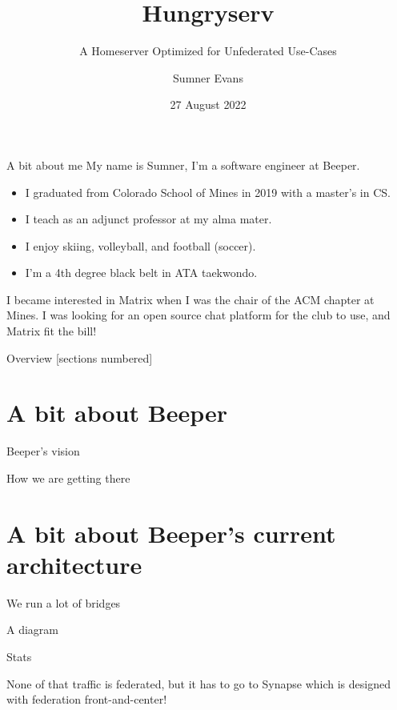 \documentclass{beeper}
\title{Hungryserv}
\subtitle{A Homeserver Optimized for Unfederated Use-Cases}
\author{Sumner Evans}
\date{27 August 2022}
\begin{document}
\begin{frame}{A bit about me}
    My name is Sumner, I'm a software engineer at Beeper.
    \begin{itemize}
        \item I graduated from Colorado School of Mines in 2019 with a master's
            in CS.
        \item I teach as an adjunct professor at my alma mater.
        \item I enjoy skiing, volleyball, and football (soccer).
        \item I'm a 4th degree black belt in ATA taekwondo.
    \end{itemize}

    I became interested in Matrix when I was the chair of the ACM chapter at
    Mines. I was looking for an open source chat platform for the club to use,
    and Matrix fit the bill!
\end{frame}

\begin{frame}{Overview}
    [sections numbered]
    \tableofcontents[hideallsubsections]
\end{frame}

\section{A bit about Beeper}

\begin{frame}{Beeper's vision}
\end{frame}

\begin{frame}{How we are getting there}
\end{frame}

\section{A bit about Beeper's current architecture}

\begin{frame}{We run a lot of bridges}
\end{frame}

\begin{frame}{A diagram}
\end{frame}

\begin{frame}{Stats}

    None of that traffic is federated, but it has to go to Synapse which is
    designed with federation front-and-center!
\end{frame}
\end{document}
